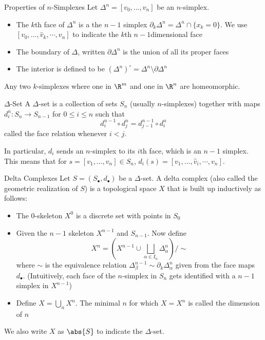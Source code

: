 \documentclass[a4paper]{article}
\begin{document}
\begin{defn}{Properties of $n$-Simplexes}{} Let $\Delta^n=[v_0,\dots,v_n]$ be an $n$-simplex. 
\begin{itemize}
\item The $k$th face of $\Delta^n$ is a the $n-1$ simplex $\partial_k\Delta^n=\Delta^n\cap\{x_k=0\}$. We use $[v_0,\dots,\hat{v}_k,\cdots,v_n]$ to indicate the $k$th $n-1$dimensional face
\item The boundary of $\Delta$, written $\partial\Delta^n$ is the union of all its proper faces
\item The interior is defined to be $(\Delta^n)^\circ=\Delta^n\setminus\partial\Delta^n$
\end{itemize}
\end{defn}

\begin{lmm}{}{} Any two $k$-simplexes where one in $\R^m$ and one in $\R^n$ are homeomorphic. 
\end{lmm}

\begin{defn}{$\Delta$-Set}{} A $\Delta$-set is a collection of sets $S_n$ (usually $n$-simplexes) together with maps $d_i^n:S_n\to S_{n-1}$ for $0\leq i\leq n$ such that $$d_i^{n-1}\circ d_j^n=d_{j-1}^{n-1}\circ d_i^n$$ called the face relation whenever $i<j$. 
\end{defn}

In particular, $d_i$ sends an $n$-simplex to its $i$th face, which is an $n-1$ simplex. This means that for $s=[v_1,\dots,v_n]\in S_n$, $d_i(s)=[v_1,\dots,\hat{v}_i,\cdots,v_n]$. 

\begin{defn}{Delta Complexes}{} Let $S=(S_\bullet,d_\bullet)$ be a $\Delta$-set. A delta complex (also called the geometric realization of $S$) is a topological space $X$ that is built up inductively as follows: 
\begin{itemize}
\item The $0$-skeleton $X^0$ is a discrete set with points in $S_0$
\item Given the $n-1$ skeleton $X^{n-1}$ and $S_{n-1}$. Now define $$X^n=\left(X^{n-1}\cup\bigsqcup_{\alpha\in I_n}\Delta_\alpha^n\right)/\sim$$ where $\sim$ is the equivalence relation $\Delta_\beta^{n-1}\sim\partial_k\Delta_\alpha^n$ given from the face maps $d_\bullet$. (Intuitively, each face of the $n$-simplex in $S_n$ gets identified with a $n-1$ simplex in $X^{n-1}$)
\item Define $X=\bigcup_nX^n$. The minimal $n$ for which $X=X^n$ is called the dimension of $n$
\end{itemize}
We also write $X$ as $\abs{S}$ to indicate the $\Delta$-set. 
\end{defn}
\end{document}
